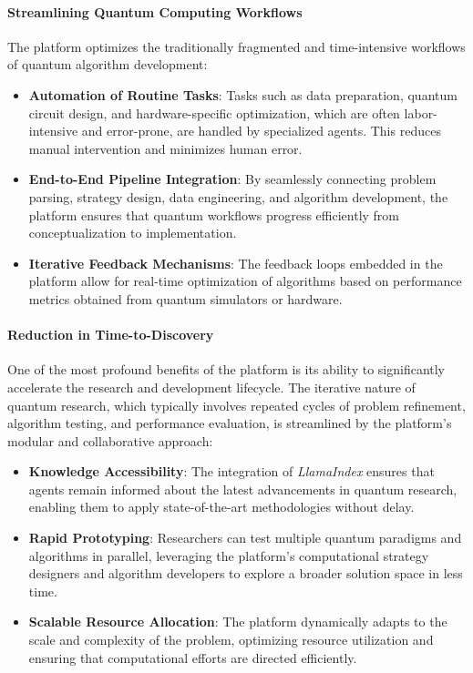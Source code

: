 \documentclass[12pt]{article}
\begin{document}
\paragraph{Streamlining Quantum Computing Workflows}
The platform optimizes the traditionally fragmented and time-intensive workflows of quantum algorithm development:
\begin{itemize}
    \item \textbf{Automation of Routine Tasks}: Tasks such as data preparation, quantum circuit design, and hardware-specific optimization, which are often labor-intensive and error-prone, are handled by specialized agents. This reduces manual intervention and minimizes human error.
    \item \textbf{End-to-End Pipeline Integration}: By seamlessly connecting problem parsing, strategy design, data engineering, and algorithm development, the platform ensures that quantum workflows progress efficiently from conceptualization to implementation.
    \item \textbf{Iterative Feedback Mechanisms}: The feedback loops embedded in the platform allow for real-time optimization of algorithms based on performance metrics obtained from quantum simulators or hardware.
\end{itemize}

\paragraph{Reduction in Time-to-Discovery}
One of the most profound benefits of the platform is its ability to significantly accelerate the research and development lifecycle. The iterative nature of quantum research, which typically involves repeated cycles of problem refinement, algorithm testing, and performance evaluation, is streamlined by the platform's modular and collaborative approach:
\begin{itemize}
    \item \textbf{Knowledge Accessibility}: The integration of \textit{LlamaIndex} ensures that agents remain informed about the latest advancements in quantum research, enabling them to apply state-of-the-art methodologies without delay.
    \item \textbf{Rapid Prototyping}: Researchers can test multiple quantum paradigms and algorithms in parallel, leveraging the platform's computational strategy designers and algorithm developers to explore a broader solution space in less time.
    \item \textbf{Scalable Resource Allocation}: The platform dynamically adapts to the scale and complexity of the problem, optimizing resource utilization and ensuring that computational efforts are directed efficiently.
\end{itemize}
\end{document}
